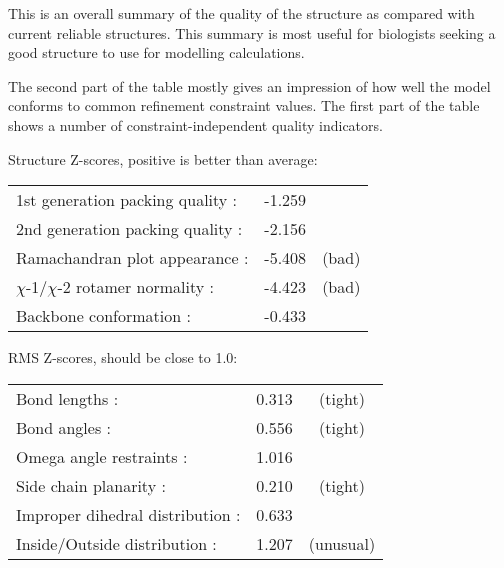 \begin{note}


\parbox{1\textwidth}{
}%


\parbox{1\textwidth}{
}%

\end{note}

\begin{note}
This is an overall summary of the quality of the structure as
compared with current reliable structures. This summary is most
useful for biologists seeking a good structure to use for modelling
calculations.

The second part of the table mostly gives an impression of how well
the model conforms to common refinement constraint values. The
first part of the table shows a number of constraint-independent
quality indicators.

\parbox{1\textwidth}{

 Structure Z-scores, positive is better than average:

\begin{tabular}{lrc}
  1st generation packing quality :&  -1.259\\
  2nd generation packing quality :&  -2.156\\
  Ramachandran plot appearance   :&  -5.408& (bad)\\
  $\chi$-1/$\chi$-2 rotamer normality  :&  -4.423& (bad)\\
  Backbone conformation          :&  -0.433\\
\end{tabular}

 RMS Z-scores, should be close to 1.0:

\begin{tabular}{lrc}
  Bond lengths                   :&   0.313& (tight)\\
  Bond angles                    :&   0.556& (tight)\\
  Omega angle restraints         :&   1.016\\
  Side chain planarity           :&   0.210& (tight)\\
  Improper dihedral distribution :&   0.633\\
  Inside/Outside distribution    :&   1.207& (unusual)\\
\end{tabular}
}%

\end{note}


